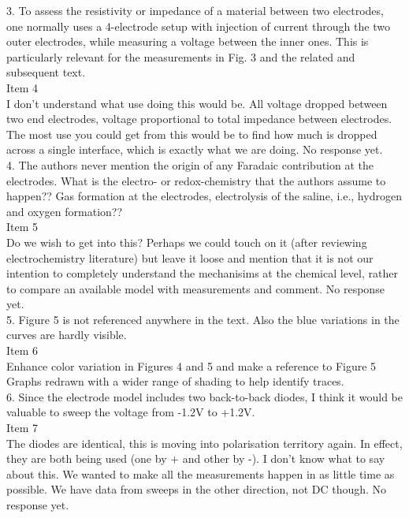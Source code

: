 \documentclass[journal, a4paper]{IEEEtran}
\begin{document}
{{3. To assess the resistivity or impedance of a material between two electrodes, one normally uses a 4-electrode setup with injection of current through the two outer electrodes, while measuring a voltage between the inner ones. This is particularly relevant for the measurements in Fig. 3 and the related and subsequent text.\\
{\color{OliveGreen} 
    Item 4\\
    {\color{Red} I don't understand what use doing this would be. All voltage dropped between two end electrodes, voltage proportional to total impedance between electrodes. The most use you could get from this would be to find how much is dropped across a single interface, which is exactly what we are doing.}
    No response yet.    
}\\

4. The authors never mention the origin of any Faradaic contribution at the electrodes. What is the electro- or redox-chemistry that the authors assume to happen?? Gas formation at the electrodes, electrolysis of the saline, i.e., hydrogen and oxygen formation??\\
{\color{OliveGreen}
    Item 5\\
    {\color{Red} Do we wish to get into this? Perhaps we could touch on it (after reviewing electrochemistry literature) but leave it loose and mention that it is not our intention to completely understand the mechanisims at the chemical level, rather to compare an available model with measurements and comment.}
    No response yet.
}\\

5. Figure 5 is not referenced anywhere in the text. Also the blue variations in the curves are hardly visible.\\
{\color{OliveGreen} 
    Item 6\\
    {\color{Red} Enhance color variation in Figures 4 and 5 and make a reference to Figure 5}
    Graphs redrawn with a wider range of shading to help identify traces.
}\\

6. Since the electrode model includes two back-to-back diodes, I think it would be valuable to sweep the voltage from -1.2V to +1.2V.\\
{\color{OliveGreen}
    Item 7\\
    {\color{Red} The diodes are identical, this is moving into polarisation territory again. In effect, they are both being used (one by + and other by -). I don't know what to say about this. We wanted to make all the measurements happen in as little time as possible. We have data from sweeps in the other direction, not DC though.}
    No response yet.
}\\

}}
\end{document}
